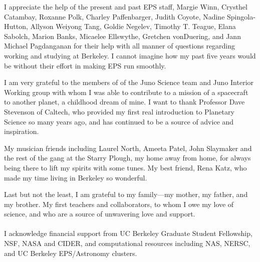 \documentclass[phd,12pt]{ucbthesis}
\begin{document}
\begin{frontmatter}
\begin{acknowledgements}
I appreciate the help of the present and past EPS staff, Margie Winn, Crysthel
Catambay, Roxanne Polk, Charley Paffenbarger, Judith Coyote, Nadine Spingola-Hutton,
Allyson Weiyong Tang, Goldie Negelev, Timothy T. Teague, Elana Sabolch, Marion Banks,
Micaelee Ellswythe, Gretchen vonDuering, and Jann Michael Pagdanganan for their help
with all manner of questions regarding working and studying at Berkeley.  I cannot
imagine how my past five years would be without their effort in making EPS run
smoothly.

I am very grateful to the members of of the Juno Science team and Juno Interior
Working group with whom I was able to contribute to a mission of a spacecraft to
another planet, a childhood dream of mine.
I want to thank Professor Dave Stevenson of Caltech, who provided my first real introduction
to Planetary Science so many years ago, and has continued to be a source of advice
and inspiration.

My musician friends including Laurel North, Ameeta Patel,  John
Slaymaker and the rest of the gang at the Starry Plough, my home away from home, for
always being there to lift my spirits with some tunes.
My best friend, Rena Katz, who made my time living in Berkeley so wonderful.

Last but not the least, I am grateful to my family---my mother, my father, and my
brother. My first teachers and collaborators, to whom I owe my love of science, and
who are a source of unwavering love and support. \\\\

I acknowledge financial support from UC Berkeley Graduate Student Fellowship, NSF,
NASA and CIDER, and computational resources including NAS, NERSC, and UC Berkeley
EPS/Astronomy clusters.

\end{acknowledgements}

\end{frontmatter}

\pagestyle{headings}














%
%
%

%
%



\end{document}

